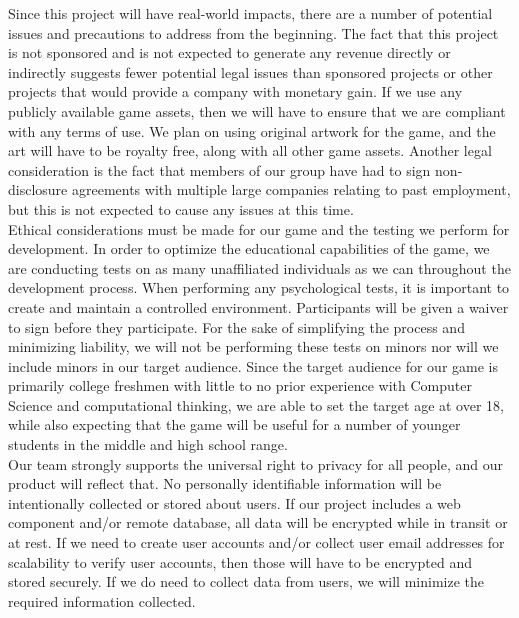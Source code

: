 Since this project will have real-world impacts, there are a number of
potential issues and precautions to address from the beginning. The fact that
this project is not sponsored and is not expected to generate any revenue
directly or indirectly suggests fewer potential legal issues than sponsored
projects or other projects that would provide a company with monetary gain. If we use any
publicly available game assets, then we will have to ensure that we are
compliant with any terms of use. We plan on using original artwork for the game,
and the art will have to be royalty free, along with all other game assets.
Another legal consideration is the fact that members of our group have had to
sign non-disclosure agreements with multiple large companies relating to past
employment, but this is not expected to cause any issues at this time.\\

Ethical considerations must be made for our game and the testing we perform for
development. In order to optimize the educational capabilities of the game, we
are conducting tests on as many unaffiliated individuals as we can throughout
the development process. When performing any psychological tests, it is
important to create and maintain a controlled environment. Participants will be 
given a waiver to sign before they participate. For the sake of simplifying
the process and minimizing liability, we will not be performing these tests on
minors nor will we include minors in our target audience. Since the target
audience for our game is primarily college freshmen with little to no prior 
experience with Computer Science and computational thinking, we are able to 
set the target age at over 18, while also expecting that the game will be useful 
for a number of younger students in the middle and high school range.\\

Our team strongly supports the universal right to privacy for all people, and
our product will reflect that. No personally identifiable information will be
intentionally collected or stored about users. If our project includes a web
component and/or remote database, all data will be encrypted while in transit
or at rest. If we need to create user accounts and/or collect user email
addresses for scalability to verify user accounts, then those will have to be
encrypted and stored securely. If we do need to collect data from users, we 
will minimize the required information collected.\\